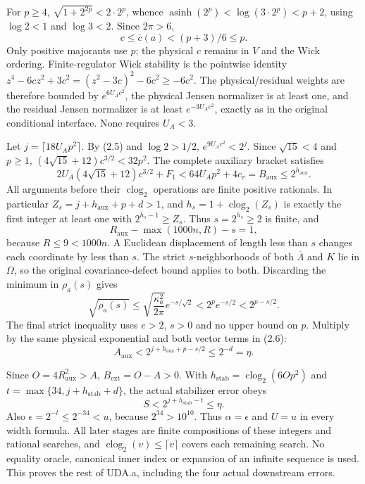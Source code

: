 For $p\ge4$, $\sqrt{1+2^{2p}}<2\cdot2^p$, whence
$\operatorname{asinh}(2^p)<\log(3\cdot2^p)<p+2$, using
$\log2<1$ and $\log3<2$. Since $2\pi>6$,
\begin{equation}c\le\overline c(a)<(p+3)/6\le p.\tag{2.5}\end{equation}
Only positive majorants use $p$; the physical $c$ remains in $V$ and the
Wick ordering. Finite-regulator Wick stability is the pointwise identity
$z^4-6cz^2+3c^2=(z^2-3c)^2-6c^2\ge-6c^2$.
The physical/residual weights are therefore bounded by $e^{6U_Ac^2}$,
the physical Jensen normalizer is at least one, and the residual Jensen
normalizer is at least $e^{-3U_Ac^2}$, exactly as in the original
conditional interface. None requires $U_A<3$.

Let $j=\lceil18U_Ap^2\rceil$. By (2.5) and $\log2>1/2$,
$e^{9U_Ac^2}<2^j$. Since $\sqrt{15}<4$ and $p\ge1$,
$(4\sqrt{15}+12)c^{3/2}<32p^2$. The complete auxiliary bracket satisfies
\begin{equation}
 2U_A(4\sqrt{15}+12)c^{3/2}+F_1
 <64U_Ap^2+4c_r=B_{\mathrm{aux}}\le2^{h_{\mathrm{aux}}}.\tag{2.6}
\end{equation}
All arguments before their $\operatorname{clog}_2$ operations are finite
positive rationals. In particular $Z_s=j+h_{\mathrm{aux}}+p+d>1$, and
$h_s=1+\operatorname{clog}_2(Z_s)$ is exactly the first integer at least
one with $2^{h_s-1}\ge Z_s$. Thus $s=2^{h_s}\ge2$ is finite, and
\[
 R_{\mathrm{aux}}-\max(1000n,R)-s=1,
\]
because $R\le9<1000n$. A Euclidean displacement of length less than $s$
changes each coordinate by less than $s$. The strict $s$-neighborhoods
of both $\overline\Lambda$ and $K$ lie in $\Omega$, so the original
covariance-defect bound applies to both. Discarding the minimum in
$\rho_a(s)$ gives
\begin{equation}
 \sqrt{\rho_a(s)}\le\sqrt{\frac{\kappa_a^2}{2\pi}}e^{-s/\sqrt2}
 <2^p e^{-s/2}<2^{p-s/2}.\tag{2.7}
\end{equation}
The final strict inequality uses $e>2$, $s>0$ and no upper bound on $p$.
Multiply by the same physical exponential and both vector terms in (2.6):
\begin{equation}
 A_{\mathrm{aux}}<2^{j+h_{\mathrm{aux}}+p-s/2}\le2^{-d}=\eta.\tag{2.8}
\end{equation}

Since $O=4R_{\mathrm{aux}}^2>A$, $B_{\mathrm{ext}}=O-A>0$.
With $h_{\mathrm{stab}}=\operatorname{clog}_2(6Op^2)$ and
$t=\max\{34,j+h_{\mathrm{stab}}+d\}$, the actual stabilizer error obeys
\begin{equation}S<2^{j+h_{\mathrm{stab}}-t}\le\eta.\tag{2.9}\end{equation}
Also $\epsilon=2^{-t}\le2^{-34}<u$, because $2^{34}>10^{10}$.
Thus $\alpha=\epsilon$ and $U=u$ in every width formula.
All later stages are finite compositions of these integers and rational
searches, and $\operatorname{clog}_2(v)\le\lceil v\rceil$ covers each
remaining search. No equality oracle, canonical inner index or expansion
of an infinite sequence is used. This proves the rest of UDA.a, including
the four actual downstream errors.


